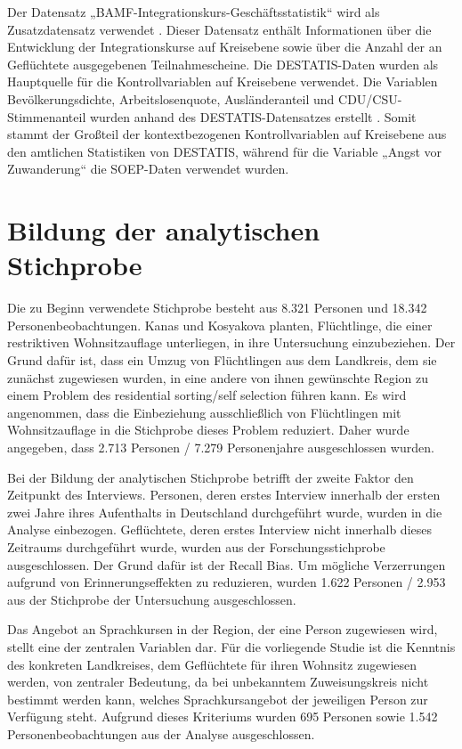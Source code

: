 Der Datensatz „BAMF-Integrationskurs-Geschäftsstatistik“ wird als Zusatzdatensatz verwendet \parencite{BAMF2020}. Dieser Datensatz enthält Informationen über die Entwicklung der Integrationskurse auf Kreisebene sowie über die Anzahl der an Geflüchtete ausgegebenen Teilnahmescheine. Die DESTATIS-Daten wurden als Hauptquelle für die Kontrollvariablen auf Kreisebene verwendet. Die Variablen Bevölkerungsdichte, Arbeitslosenquote, Ausländeranteil und CDU/CSU-Stimmenanteil wurden anhand des DESTATIS-Datensatzes erstellt \parencite{destatis_2021e,destatis_2021d,destatis_2021c,destatis_2021b,destatis_2021a}. Somit stammt der Großteil der kontextbezogenen Kontrollvariablen auf Kreisebene aus den amtlichen Statistiken von DESTATIS, während für die Variable „Angst vor Zuwanderung“ die SOEP-Daten verwendet wurden.


\section{Bildung der analytischen Stichprobe}
\label{cha:bildung}

Die zu Beginn verwendete Stichprobe besteht aus 8.321 Personen und 18.342 Personenbeobachtungen. Kanas und Kosyakova planten, Flüchtlinge, die einer restriktiven Wohnsitzauflage unterliegen, in ihre Untersuchung einzubeziehen. Der Grund dafür ist, dass ein Umzug von Flüchtlingen aus dem Landkreis, dem sie zunächst zugewiesen wurden, in eine andere von ihnen gewünschte Region zu einem Problem des residential sorting/self selection führen kann. Es wird angenommen, dass die Einbeziehung ausschließlich von Flüchtlingen mit Wohnsitzauflage in die Stichprobe dieses Problem reduziert. Daher wurde angegeben, dass 2.713 Personen / 7.279 Personenjahre ausgeschlossen wurden.



Bei der Bildung der analytischen Stichprobe betrifft der zweite Faktor den Zeitpunkt des Interviews. Personen, deren erstes Interview innerhalb der ersten zwei Jahre ihres Aufenthalts in Deutschland durchgeführt wurde, wurden in die Analyse einbezogen. Geflüchtete, deren erstes Interview nicht innerhalb dieses Zeitraums durchgeführt wurde, wurden aus der Forschungsstichprobe ausgeschlossen. Der Grund dafür ist der Recall Bias. Um mögliche Verzerrungen aufgrund von Erinnerungseffekten zu reduzieren, wurden 1.622 Personen / 2.953 aus der Stichprobe der Untersuchung ausgeschlossen.

Das Angebot an Sprachkursen in der Region, der eine Person zugewiesen wird, stellt eine der zentralen Variablen dar. Für die vorliegende Studie ist die Kenntnis des konkreten Landkreises, dem Geflüchtete für ihren Wohnsitz zugewiesen werden, von zentraler Bedeutung, da bei unbekanntem Zuweisungskreis nicht bestimmt werden kann, welches Sprachkursangebot der jeweiligen Person zur Verfügung steht. Aufgrund dieses Kriteriums wurden 695 Personen sowie 1.542 Personenbeobachtungen aus der Analyse ausgeschlossen.

